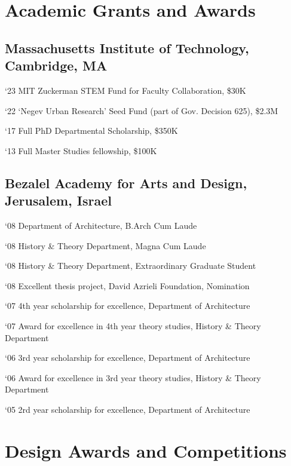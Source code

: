 \section*{Academic Grants and Awards}

\subsection*{Massachusetts Institute of Technology, Cambridge, MA}
\begin{tablist}
	\item[`23] \tab MIT Zuckerman STEM Fund for Faculty Collaboration, \$30K
	\item[`22] \tab `Negev Urban Research' Seed Fund (part of Gov. Decision 625), \$2.3M
	\item[`17] \tab Full PhD Departmental Scholarship, \$350K
	\item[`13] \tab Full Master Studies fellowship, \$100K
\end{tablist}

\subsection*{Bezalel Academy for Arts and Design, Jerusalem, Israel}
\begin{tablist}
	\item[`08] \tab Department of Architecture, B.Arch Cum Laude
	\item[`08] \tab History \& Theory Department, Magna Cum Laude
	\item[`08] \tab History \& Theory Department, Extraordinary Graduate Student
	\item[`08] \tab Excellent thesis project, David Azrieli Foundation, Nomination
	\item[`07] \tab 4th year scholarship for excellence, Department of Architecture \item[`07]\tab  Award for excellence in 4th year theory studies, History \& Theory Department
	\item[`06]\tab  3rd year scholarship for excellence, Department of Architecture \item[`06]\tab  Award for excellence in 3rd year theory studies, History \& Theory Department
	\item[`05]\tab  2rd year scholarship for excellence, Department of Architecture

\end{tablist}

\section*{Design Awards and Competitions}

